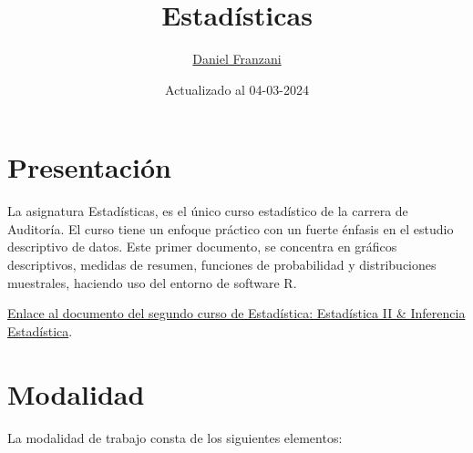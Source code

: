 \documentclass[
  11pt,
]{book}
\title{Estadísticas}
\author{\href{https://dfranzani.github.io/website/principal/home.html}{Daniel Franzani}}
\date{Actualizado al 04-03-2024}
\theoremstyle{definition}
\theoremstyle{definition}
\theoremstyle{definition}
\theoremstyle{definition}
\theoremstyle{remark}
\begin{document}
\maketitle

{
\setcounter{tocdepth}{3}
\tableofcontents
}
\chapter*{Presentación}\label{presentaciuxf3n}

La asignatura Estadísticas, es el único curso estadístico de la carrera de Auditoría. El curso tiene un enfoque práctico con un fuerte énfasis en el estudio descriptivo de datos. Este primer documento, se concentra en gráficos descriptivos, medidas de resumen, funciones de probabilidad y distribuciones muestrales, haciendo uso del entorno de software R.

\href{https://dfranzani.github.io/Estadistica_II/}{Enlace al documento del segundo curso de Estadística: Estadística II \& Inferencia Estadística}.

\chapter*{Modalidad}\label{modalidad}

La modalidad de trabajo consta de los siguientes elementos:
\end{document}
